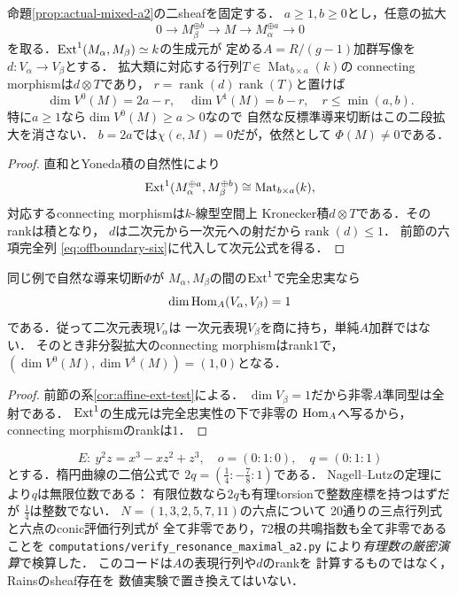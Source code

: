 \begin{proposition}[二段混合拡大全体での非消失]
\label{prop:a2-directsum}
命題\ref{prop:actual-mixed-a2}の二sheafを固定する．
$a\ge1,b\ge0$とし，任意の拡大
\[
0\longrightarrow M_\beta^{\oplus b}\longrightarrow M
 \longrightarrow M_\alpha^{\oplus a}\longrightarrow0
\]
を取る．$\operatorname{Ext}^1(M_\alpha,M_\beta)\simeq k$の生成元が
定める$A=R/(g-1)$加群写像を
$d:V_\alpha\to V_\beta$とする．
拡大類に対応する行列$T\in\operatorname{Mat}_{b\times a}(k)$の
connecting morphismは$d\otimes T$であり，
$r=\operatorname{rank}(d)\operatorname{rank}(T)$と置けば
\[
\boxed{
\dim V^0(M)=2a-r,\quad
\dim V^1(M)=b-r,\quad
r\le\min(a,b).}
\]
特に$a\ge1$なら$\dim V^0(M)\ge a>0$なので
自然な反標準導来切断はこの二段拡大を消さない．
$b=2a$では$\chi(e,M)=0$だが，依然として
$\Phi(M)\ne0$である．
\end{proposition}
\begin{proof}
直和とYoneda積の自然性により
\[
\operatorname{Ext}^1(M_\alpha^{\oplus a},M_\beta^{\oplus b})
 \cong\operatorname{Mat}_{b\times a}(k),
\]
対応するconnecting morphismは$k$-線型空間上
Kronecker積$d\otimes T$である．そのrankは積となり，
$d$は二次元から一次元への射だから$\operatorname{rank}(d)\le1$．
前節の六項完全列
\eqref{eq:offboundary-six}に代入して次元公式を得る．
\end{proof}

\begin{corollary}[全$q$導来同値に対する明示的な検査条件]
\label{cor:a2-ff}
同じ例で自然な導来切断$\Phi$が
$M_\alpha,M_\beta$の間の$\operatorname{Ext}^1$で完全忠実なら
\[
 \dim\operatorname{Hom}_A(V_\alpha,V_\beta)=1
\]
である．従って二次元表現$V_\alpha$は
一次元表現$V_\beta$を商に持ち，単純$A$加群ではない．
そのとき非分裂拡大のconnecting morphismはrank$1$で，
$(\dim V^0(M),\dim V^1(M))=(1,0)$となる．
\end{corollary}
\begin{proof}
前節の系\ref{cor:affine-ext-test}による．
$\dim V_\beta=1$だから非零$A$準同型は全射である．
$\operatorname{Ext}^1$の生成元は完全忠実性の下で非零の
$\operatorname{Hom}_A$へ写るから，connecting morphismのrankは$1$．
\end{proof}

\begin{remark}[有理数上の検算例]
\label{rem:a2-rational-witness}
\[
 E:\ y^2z=x^3-xz^2+z^3,\quad o=(0:1:0),\quad
 q=(0:1:1)
\]
とする．楕円曲線の二倍公式で
$2q=(\frac14:-\frac78:1)$である．
Nagell--Lutzの定理により$q$は無限位数である：
有限位数なら$2q$も有理torsionで整数座標を持つはずだが
$\frac14$は整数でない．
$N=(1,3,2,5,7,11)$の六点について
20通りの三点行列式と六点のconic評価行列式が
全て非零であり，72根の共鳴指数も全て非零であることを
\texttt{computations/verify\_resonance\_maximal\_a2.py}
により\emph{有理数の厳密演算}で検算した．
このコードは$A$の表現行列や$d$のrankを
計算するものではなく，Rainsのsheaf存在を
数値実験で置き換えてはいない．
\end{remark}
